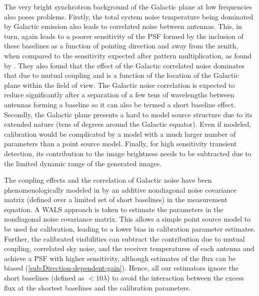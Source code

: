\documentclass[referee]{aa}
\begin{document}
The very bright synchrotron background  of the Galactic plane at low frequencies
also poses problems. Firstly, the total system noise temperature being dominated
by Galactic emission  also leads to correlated noise  between antennas. This, in
turn, again leads to a poorer sensitivity  of the PSF formed by the inclusion of
these baselines  as a function of  pointing direction and away  from the zenith,
when compared to the sensitivity expected after pattern multiplication, as found
by  \citet{ellingson2011sensitivity}.  They also  found that  the effect  of the
Galactic  correlated  noise dominates  that  due to  mutual  coupling  and is  a
function of  the location of  the Galactic plane  within the field of  view. The
Galactic  noise  correlation  is   expected  to  reduce  significantly  after  a
separation of a few tens of wavelengths between antennas forming a baseline
so it can  also be termed  a short baseline  effect.  Secondly, the  Galactic plane
presents a  hard to model source structure  due to its extended  nature (tens of
degrees around  the Galactic  equator).  Even if  modeled, calibration  would be
complicated by a model with a much larger number of parameters than a point source
model.  Finally,  for high sensitivity  transient detection, its  contribution to
the image brightness needs to be  subtracted due to the limited dynamic range of
the generated images.

The  coupling  effects   and  the  correlation  of  Galactic   noise  have  been
phenomenologically   modeled  in   \citet{wijnholds2010self}   by  an   additive
nondiagonal  noise  covariance matrix  (defined  over  a  limited set  of  short
baselines) in the measurement equation. A WALS approach is taken to estimate the
parameters in  the nondiagonal  noise covariance matrix.   This allows  a simple
point  source model  to be  used for  calibration, leading  to a  lower  bias in
calibration  parameter  estimates.   Further,  the calibrated  visibilities  can
subtract the contribution due to  mutual coupling, correlated sky noise, and the
receiver temperatures of each antenna and achieve a PSF with higher sensitivity,
although      estimates      of       the      flux      can      be      biased
(\ref{sub:Direction-dependent-gain}).   Hence,  all  our estimators  ignore  the
short baselines (defined  as $<10\lambda$) to avoid the  interaction between the
excess flux at the shortest baselines and the calibration parameters.

\end{document}
